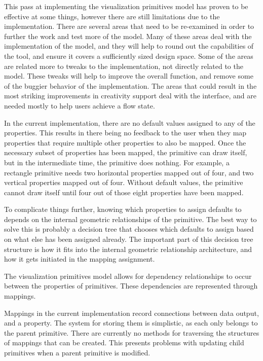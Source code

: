 \label{futureWork}
This pass at implementing the visualization primitives model has proven to be effective at some things, however there are still limitations due to the implementation.
There are several areas that need to be re-examined in order to further the work and test more of the model.
Many of these areas deal with the implementation of the model, and they will help to round out the capabilities of the tool, and ensure it covers a sufficiently sized design space.
Some of the areas are related more to tweaks to the implementation, not directly related to the model.
These tweaks will help to improve the overall function, and remove some of the buggier behavior of the implementation.
The areas that could result in the most striking improvements in creativity support deal with the interface, and are needed mostly to help users achieve a flow state.

\label{defaultValues}
In the current implementation, there are no default values assigned to any of the properties.
This results in there being no feedback to the user when they map properties that require multiple other properties to also be mapped.
Once the necessary subset of properties has been mapped, the primitive can draw itself, but in the intermediate time, the primitive does nothing.
For example, a rectangle primitive needs two horizontal properties mapped out of four, and two vertical properties mapped out of four.
Without default values, the primitive cannot draw itself until four out of those eight properties have been mapped.

To complicate things further, knowing which properties to assign defaults to depends on the internal geometric relationships of the primitive.
The best way to solve this is probably a decision tree that chooses which defaults to assign based on what else has been assigned already.
The important part of this decision tree structure is how it fits into the internal geometric relationship architecture, and how it gets initiated in the mapping assignment.

\label{primitivesGraph}
The visualization primitives model allows for dependency relationships to occur between the properties of primitives.
These dependencies are represented through mappings.

Mappings in the current implementation record connections between data output, and a property.
The system for storing them is simplistic, as each only belongs to the parent primitive.
There are currently no methods for traversing the structures of mappings that can be created.
This presents problems with updating child primitives when a parent primitive is modified.

